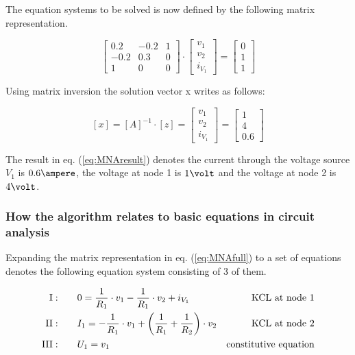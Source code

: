 The equation systems to be solved is now defined by the following
matrix representation.

\begin{equation}
\begin{bmatrix}
0.2 & -0.2 & 1\\
-0.2 & 0.3 & 0\\
1 & 0 & 0
\end{bmatrix}
\cdot
\begin{bmatrix}
v_{1}\\
v_{2}\\
i_{V_{1}}
\end{bmatrix}
=
\begin{bmatrix}
0\\
1\\
1
\end{bmatrix}
\end{equation}

Using matrix inversion the solution vector x writes as follows:

\begin{equation}
\left[x\right] = 
\left[A\right]^{-1}\cdot \left[z\right] = 
\begin{bmatrix}
v_{1}\\
v_{2}\\
i_{V_{1}}
\end{bmatrix}
=
\begin{bmatrix}
1\\
4\\
0.6
\end{bmatrix}
\label{eq:MNAresult}
\end{equation}

The result in eq. (\ref{eq:MNAresult}) denotes the current through the
voltage source $V_{1}$ is $0.6\ampere$, the voltage at node 1 is
$1\volt$ and the voltage at node 2 is $4\volt$.

\subsubsection{How the algorithm relates to basic equations in circuit analysis}

Expanding the matrix representation in eq. (\ref{eq:MNAfull}) to a set
of equations denotes the following equation system consisting of 3 of
them.

\begin{align}
\rm{I:}& \qquad 0 = \frac{1}{R_{1}}\cdot v_{1} - \frac{1}{R_{1}}\cdot v_{2} + i_{V_{1}}& \text{KCL at node 1}\\
\rm{II:}& \qquad I_{1} = -\frac{1}{R_{1}}\cdot v_{1} + \left(\frac{1}{R_{1}} + \frac{1}{R_{2}}\right)\cdot v_{2}& \text{KCL at node 2}\\
\rm{III:}& \qquad U_{1} = v_{1}& \text{constitutive equation}
\end{align}

